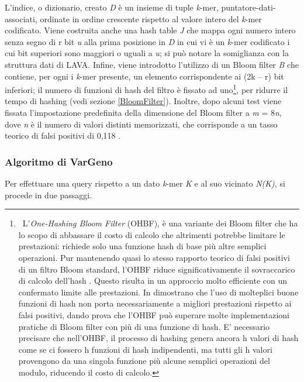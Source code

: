 \documentclass[../main.tex]{subfiles}
\begin{document}
L'indice, o dizionario, creato \textit{D} è un insieme di tuple \textlangle \textit{k}-mer, puntatore-dati-associati\textrangle, ordinate in ordine crescente rispetto al valore intero del \textit{k}-mer codificato. Viene costruita anche una hash table \textit{J} che mappa ogni numero intero senza segno di r bit \textit{u} alla prima posizione in \textit{D} in cui vi è un \textit{k}-mer codificato i cui bit superiori sono maggiori o uguali a \textit{u}; si può notare la somiglianza con la struttura dati di LAVA. Infine, viene introdotto l'utilizzo di un Bloom filter \textit{B} che contiene, per ogni i \textit{k}-mer presente, un elemento corrispondente ai (2k – r) bit inferiori; il numero di funzioni di hash del filtro è fissato ad uno\footnote{\ L'\textit{One-Hashing Bloom Filter} (OHBF), è una variante dei Bloom filter che ha lo scopo di abbassare il costo di calcolo che altrimenti potrebbe limitare le prestazioni: richiede solo una funzione hash di base più altre semplici operazioni. Pur mantenendo quasi lo stesso rapporto teorico di falsi positivi di un filtro Bloom standard, l'OHBF riduce significativamente il sovraccarico di calcolo dell'hash \cite{bloomonehash}. Questo risulta in un approccio molto efficiente con un confermato limite alle prestazioni. In \cite{bloomonehash} dimostrano che l'uso di molteplici buone funzioni di hash non porta necessariamente a migliori prestazioni rispetto ai falsi positivi, dando prova che l'OHBF può superare molte implementazioni pratiche di Bloom filter con più di una funzione di hash. E' necessario precisare che nell'OHBF, il processo di hashing genera ancora h valori di hash come se ci fossero h funzioni di hash indipendenti, ma tutti gli h valori provengono da una singola funzione più alcune semplici operazioni del modulo, riducendo il costo di calcolo.}, per ridurre il tempo di hashing (vedi sezione \ref{BloomFilter}). Inoltre, dopo alcuni test viene fissata l'impostazione predefinita della dimensione del Bloom filter a \textit{m} = 8\textit{n}, dove \textit{n} è il numero di valori distinti memorizzati, che corrisponde a un tasso teorico di falsi positivi di 0,118 \cite{sun-medvedev2018vargeno}.

\subsubsection{Algoritmo di VarGeno}

Per effettuare una query rispetto a un dato \textit{k}-mer \textit{K} e al suo vicinato \textit{N(K)}, si procede in due passaggi. 
\end{document}
